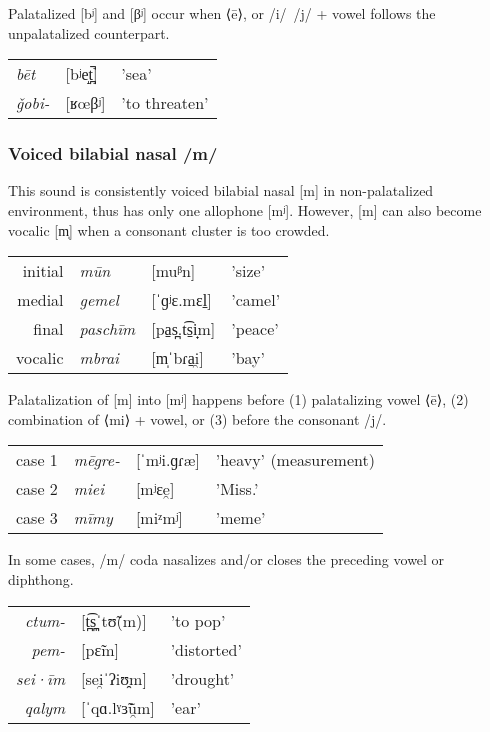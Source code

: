 Palatalized [bʲ] and [βʲ] occur when ⟨ē⟩, or /i/~/j/ + vowel follows the unpalatalized counterpart.

\begin{tabular}{lll}
\textit{bēt} & {[}bʲe̝t̪̚{]} & 'sea'          \\
\textit{ǧobi-}  & {[}ʁœβʲ{]}          & 'to threaten'
\end{tabular}

\subsubsection{Voiced bilabial nasal /m/}
This sound is consistently voiced bilabial nasal [m] in non-palatalized environment, thus has only one allophone [mʲ]. However, [m] can also become vocalic [m̩] when a consonant cluster is too crowded.

\begin{tabular}{rlll}
initial & \textit{mūn}     & {[}muᵝn{]}          & 'size'  \\
medial  & \textit{gemel}   & {[}ˈɡʲɛ.mɛl̠{]}     & 'camel' \\
final   & \textit{paschīm} & {[}pa̠s̪.t͡s̠i̟m{]} & 'peace' \\
vocalic & \textit{mbrai}   & {[}m̩ˈbɾa̠i̯{]}     & 'bay'  
\end{tabular}

Palatalization of [m] into [mʲ] happens before (1) palatalizing vowel ⟨ē⟩, (2) combination of ⟨mi⟩ + vowel, or (3) before the consonant /j/.

\begin{tabular}{rlll}
case 1 & \textit{mēgre-}   & {[}ˈmʲi.ɡɾæ{]}     & 'heavy' (measurement)                 \\
case 2 & \textit{miei}     & {[}mʲɛe̯{]}     & 'Miss.'      \\
case 3 & \textit{mīmy}  & {[}miᶻmʲ{]}      & 'meme' \\
\end{tabular}

In some cases, /m/ coda nasalizes and/or closes the preceding vowel or diphthong.

\begin{tabular}{rll}
\textit{ctum-}   & {[}t̪͡s̪̩ˈtʊ̃(m){]}     & 'to pop'\\
\textit{pem-}     & {[}pɛ̃m{]}     & 'distorted'      \\
\textit{sei·īm}  & {[}sei̯ˈʔiʊ̯m{]}      & 'drought' \\
\textit{qalym}  & {[}ˈqɑ.lˠɜ̃ũ̯m{]}      & 'ear' \\
\end{tabular}


